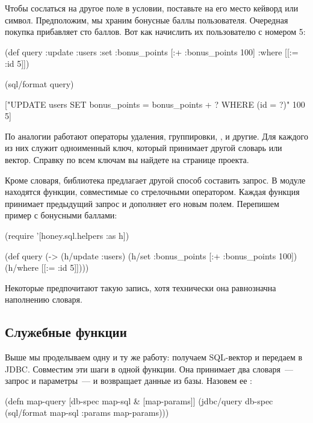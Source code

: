 Чтобы сослаться на другое поле в условии, поставьте на его место кейворд или символ. Предположим, мы храним бонусные баллы пользователя. Очередная покупка прибавляет сто баллов. Вот как начислить их пользователю с номером 5:

\begin{english}
  \begin{clojure}
(def query
  {:update :users
   :set {:bonus_points [:+ :bonus_points 100]}
   :where [[:= :id 5]]})

(sql/format query)

["UPDATE users
  SET bonus_points = bonus_points + ?
  WHERE (id = ?)" 100 5]
  \end{clojure}
\end{english}

По аналогии работают операторы удаления, группировки, ,  и другие. Для каждого из них служит одноименный ключ, который принимает другой словарь или вектор. Справку по всем ключам вы найдете на странице проекта.

Кроме словаря, библиотека предлагает другой способ составить запрос. В модуле  находятся функции, совместимые со стрелочными оператором. Каждая функция принимает предыдущий запрос и дополняет его новым полем. Перепишем пример с бонусными баллами:

\begin{english}
  \begin{clojure}
(require '[honey.sql.helpers :as h])

(def query
  (-> (h/update :users)
      (h/set {:bonus_points [:+ :bonus_points 100]})
      (h/where [[:= :id 5]])))
  \end{clojure}
\end{english}

Некоторые предпочитают такую запись, хотя технически она равнозначна наполнению словаря.

\subsection{Служебные функции}

Выше мы проделываем одну и ту же работу: получаем SQL-вектор и передаем в JDBC. Совместим эти шаги в одной функции. Она принимает два словаря~--- запрос и параметры~--- и возвращает данные из базы. Назовем ее :

\begin{english}
  \begin{clojure/lines}
(defn map-query
  [db-spec map-sql & [map-params]]
  (jdbc/query db-spec
              (sql/format map-sql
                          {:params map-params})))
  \end{clojure/lines}
\end{english}

